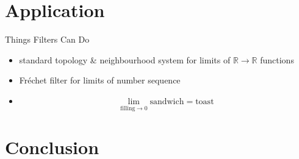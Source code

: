 \documentclass[aspectratio=169]{beamer}
\newcommand{\R}{\mathbb{R}}
\begin{document}
	\section{Application}
	
	\begin{frame}{Things Filters Can Do}
		\begin{center}
			\begin{itemize}
				\item standard topology \& neighbourhood system for limits of $\R \to \R$ functions
				\item Fr\'echet filter for limits of number sequence
				\item $$
						\lim_{\text{filling} \to 0} \text{sandwich} = \text{toast}
				$$
			\end{itemize}
		\end{center}
	\end{frame}

	\section{Conclusion}
	
\end{document}
